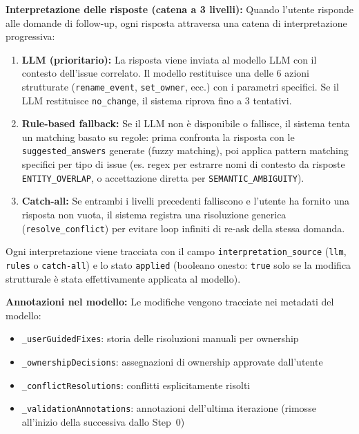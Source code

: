 \documentclass[12pt,a4paper]{report}
\begin{document}
\textbf{Interpretazione delle risposte (catena a 3 livelli):} Quando l'utente
risponde alle domande di follow-up, ogni risposta attraversa una catena di
interpretazione progressiva:
\begin{enumerate}
  \item \textbf{LLM (prioritario):} La risposta viene inviata al modello LLM
        con il contesto dell'issue correlato. Il modello restituisce una delle
        6 azioni strutturate (\texttt{rename\_event}, \texttt{set\_owner}, ecc.)
        con i parametri specifici. Se il LLM restituisce \texttt{no\_change},
        il sistema riprova fino a 3 tentativi.
  \item \textbf{Rule-based fallback:} Se il LLM non è disponibile o fallisce,
        il sistema tenta un matching basato su regole: prima confronta la risposta
        con le \texttt{suggested\_answers} generate (fuzzy matching), poi applica
        pattern matching specifici per tipo di issue (es. regex per estrarre nomi
        di contesto da risposte \texttt{ENTITY\_OVERLAP}, o accettazione diretta
        per \texttt{SEMANTIC\_AMBIGUITY}).
  \item \textbf{Catch-all:} Se entrambi i livelli precedenti falliscono e l'utente
        ha fornito una risposta non vuota, il sistema registra una risoluzione
        generica (\texttt{resolve\_conflict}) per evitare loop infiniti di
        re-ask della stessa domanda.
\end{enumerate}
Ogni interpretazione viene tracciata con il campo \texttt{interpretation\_source}
(\texttt{llm}, \texttt{rules} o \texttt{catch-all}) e lo stato \texttt{applied}
(booleano onesto: \texttt{true} solo se la modifica strutturale è stata effettivamente
applicata al modello).

\textbf{Annotazioni nel modello:} Le modifiche vengono tracciate nei metadati
del modello:
\begin{itemize}
  \item \texttt{\_userGuidedFixes}: storia delle risoluzioni manuali per ownership
  \item \texttt{\_ownershipDecisions}: assegnazioni di ownership approvate dall'utente
  \item \texttt{\_conflictResolutions}: conflitti esplicitamente risolti
  \item \texttt{\_validationAnnotations}: annotazioni dell'ultima iterazione
        (rimosse all'inizio della successiva dallo Step~0)
\end{itemize}
\end{document}
